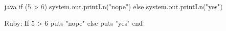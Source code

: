 java
  if (5 > 6) {
    system.out.printLn("nope")
  }
  else {
    system.out.printLn("yes")
  }

Ruby:
  If 5 > 6 
    puts "nope"
  else 
    puts "yes"
  end